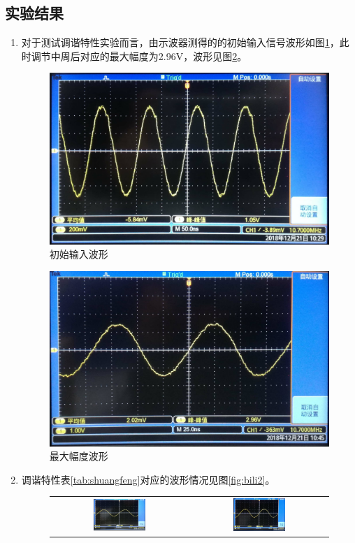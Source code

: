 \documentclass[12pt]{article}%
\numberwithin{equation}{section}
\begin{document}
\subsection{实验结果}
\begin{enumerate}\addtolength{\itemsep}{-1.5ex}
\item 对于测试调谐特性实验而言，由示波器测得的的初始输入信号波形如图\ref{img:shuru}，此时调节中周后对应的最大幅度为2.96V，波形见图\ref{img:shuchu}。
\begin{figure}[htbp]
  \centering
  \includegraphics[width=.4\textwidth]{gaopin4/gaopin401.jpg} 
  \caption{ 初始输入波形} 
  \label{img:shuru} 
\end{figure}
\begin{figure}[htbp]
  \centering
  \includegraphics[width=.4\textwidth]{gaopin4/gaopin407.jpg} 
  \caption{ 最大幅度波形} 
  \label{img:shuchu} 
\end{figure}
\item 调谐特性表\ref{tab:shuangfeng}对应的波形情况见图\ref{fig:bili2}。
\begin{figure}[htbp]
\centering
\begin{tabular}{cc}
\includegraphics[width=0.4\textwidth]{gaopin4/gaopin409.jpg}&\includegraphics[width=0.4\textwidth]{gaopin4/gaopin408.jpg}\\

\end{tabular}
\end{figure}
\end{enumerate}
\end{document}
